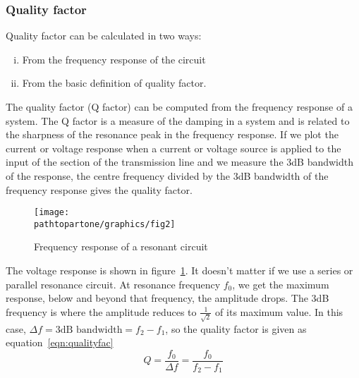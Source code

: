 \subsubsection{Quality factor}
Quality factor can be calculated in two ways:
\begin{enumerate}[(i)]
\item From the frequency response of the circuit
\item From the basic definition of quality factor.
\end{enumerate}
The quality factor (Q factor) can be computed from the frequency response of a system. The Q factor is a measure of the damping in a system and is related to the sharpness of the resonance peak in the frequency response. If we plot the current or voltage response when a current or voltage source is applied to the input of the section of the transmission line and we measure the 3dB bandwidth of the response, the centre frequency divided by the 3dB bandwidth of the frequency response gives the quality factor.
\begin{figure}[h]
\centering
\texttt{[image: \\pathtopartone/graphics/fig2]}
\caption{Frequency response of a resonant circuit}
\label{fig:fig2}
\end{figure}

The voltage response is shown in figure~\ref{fig:fig2}. It doesn't matter if we use a series or parallel resonance circuit. At resonance frequency $ f_0 $, we get the maximum response, below and beyond that frequency, the amplitude drops. The 3dB frequency is where the amplitude reduces to $ \frac{1}{\sqrt{2}} $ of its maximum value. In this case, $ \Delta f=3\text{dB bandwidth} =f_{2}-f_{1} $, so the quality factor is given as equation~\eqref{eqn:qualityfac}
\begin{equation}
Q=\frac{f_0}{\Delta f}=\frac{f_0}{f_{2}-f_{1}}
\label{eqn:qualityfac}
\end{equation} 

